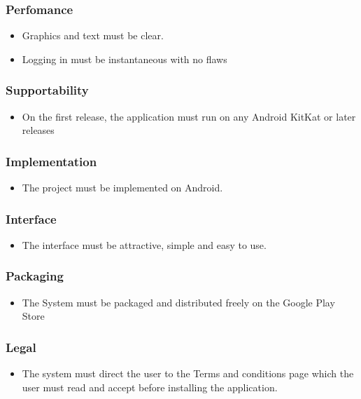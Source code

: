 \documentclass[15, notitlepage]{article}
\begin{document}
\subsubsection{Perfomance}
\begin{itemize}
	\item Graphics and text must be clear.
	\item Logging in must be instantaneous with no flaws
\end{itemize}
	 
\subsubsection{Supportability}
	\begin{itemize}
		\item On the first release, the application must run on any Android KitKat or later releases 
	\end{itemize}
\subsubsection{Implementation}
	\begin{itemize}
		\item The project must be implemented on Android.
	\end{itemize}
\subsubsection{Interface}
	\begin{itemize}
		\item The interface must be attractive, simple and easy to use.
	\end{itemize}
\subsubsection{Packaging}
	\begin{itemize}
		\item The System must be packaged and distributed freely on the Google Play Store
	\end{itemize}
\subsubsection{Legal}
	\begin{itemize}
		\item The system must direct the user to the Terms and conditions page which the user must read and accept before installing the application.
	\end{itemize}
\end{document}
